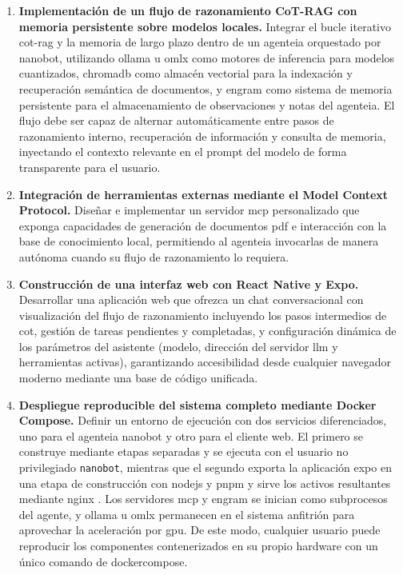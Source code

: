 \begin{enumerate}
    \item \textbf{Implementación de un flujo de razonamiento CoT-RAG con memoria persistente sobre modelos locales.} Integrar el bucle iterativo \gls{cot}-\gls{rag} y la memoria de largo plazo dentro de un \gls{agenteia} orquestado por \gls{nanobot}, utilizando \gls{ollama} u \gls{omlx} como motores de inferencia para modelos cuantizados, \gls{chromadb} como almacén vectorial para la indexación y recuperación semántica de documentos, y \gls{engram} como sistema de memoria persistente para el almacenamiento de observaciones y notas del \gls{agenteia}. El flujo debe ser capaz de alternar automáticamente entre pasos de razonamiento interno, recuperación de información y consulta de memoria, inyectando el contexto relevante en el \gls{prompt} del modelo de forma transparente para el usuario.

    \item \textbf{Integración de herramientas externas mediante el Model Context Protocol.} Diseñar e implementar un servidor \gls{mcp} personalizado que exponga capacidades de generación de documentos \gls{pdf} e interacción con la base de conocimiento local, permitiendo al \gls{agenteia} invocarlas de manera autónoma cuando su flujo de razonamiento lo requiera.

    \item \textbf{Construcción de una interfaz web con React Native y Expo.} Desarrollar una aplicación web que ofrezca un chat conversacional con visualización del flujo de razonamiento incluyendo los pasos intermedios de \gls{cot}, gestión de tareas pendientes y completadas, y configuración dinámica de los parámetros del asistente (modelo, dirección del servidor \gls{llm} y herramientas activas), garantizando accesibilidad desde cualquier navegador moderno mediante una base de código unificada.

    \item \textbf{Despliegue reproducible del sistema completo mediante Docker Compose.} Definir un entorno de ejecución con dos servicios diferenciados, uno para el \gls{agenteia} \gls{nanobot} y otro para el cliente web. El primero se construye mediante etapas separadas y se ejecuta con el usuario no privilegiado \texttt{nanobot}, mientras que el segundo exporta la aplicación \gls{expo} en una etapa de construcción con \gls{nodejs} y \gls{pnpm} y sirve los activos resultantes mediante \gls{nginx} \cite{docker2026multistage,nginx2026}. Los servidores \gls{mcp} y \gls{engram} se inician como subprocesos del agente, y \gls{ollama} u \gls{omlx} permanecen en el sistema anfitrión para aprovechar la aceleración por \gls{gpu}. De este modo, cualquier usuario puede reproducir los componentes contenerizados en su propio \gls{hardware} con un único comando de \gls{dockercompose}.


\end{enumerate}
